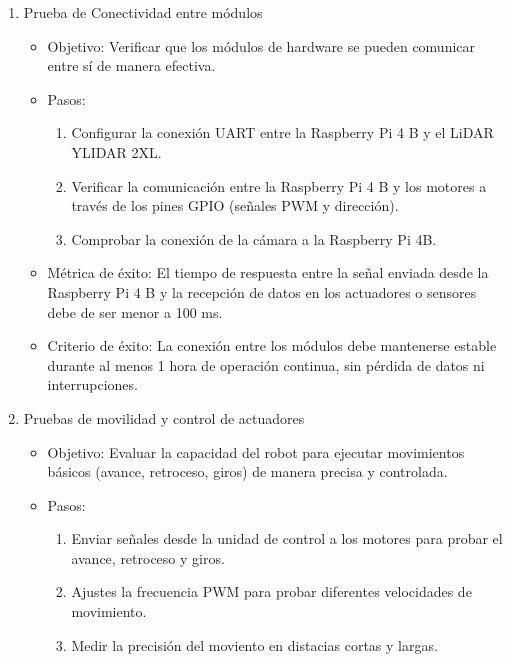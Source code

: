     \begin{enumerate}
        \item Prueba de Conectividad entre m\'odulos
        \begin{itemize}
            \item Objetivo: Verificar que los m\'odulos de hardware se pueden comunicar
                entre s\'i de manera efectiva.
            \item Pasos:
                \begin{enumerate}
                    \item Configurar la conexi\'on UART entre la Raspberry Pi 4 B y el LiDAR YLIDAR 2XL.
                    \item Verificar la comunicaci\'on entre la Raspberry Pi 4 B y los motores a trav\'es de los pines GPIO (se\~nales PWM y direcci\'on).
                    \item Comprobar la conexi\'on de la c\'amara a la Raspberry Pi 4B.
                \end{enumerate}
            \item M\'etrica de \'exito: El tiempo de respuesta entre la se\~nal enviada desde la Raspberry Pi 4 B y la 
                recepci\'on de datos en los actuadores o sensores debe de ser menor a 100 ms.
            \item Criterio de \'exito: La conexi\'on entre los m\'odulos debe mantenerse
                estable durante al menos 1 hora de operaci\'on continua, sin p\'erdida de
                datos ni interrupciones.
        \end{itemize}
        \item Pruebas de movilidad y control de actuadores
        \begin{itemize}
            \item Objetivo: Evaluar la capacidad del robot para ejecutar movimientos b\'asicos
                (avance, retroceso, giros) de manera precisa y controlada.
            \item Pasos:
                \begin{enumerate}
                    \item Enviar se\~nales desde la unidad de control a los motores para probar el avance, retroceso y giros.
                    \item Ajustes la frecuencia PWM para probar diferentes velocidades de movimiento.
                    \item Medir la precisi\'on del moviento en distacias cortas y largas.
                \end{enumerate}

\end{itemize}
\end{enumerate}
